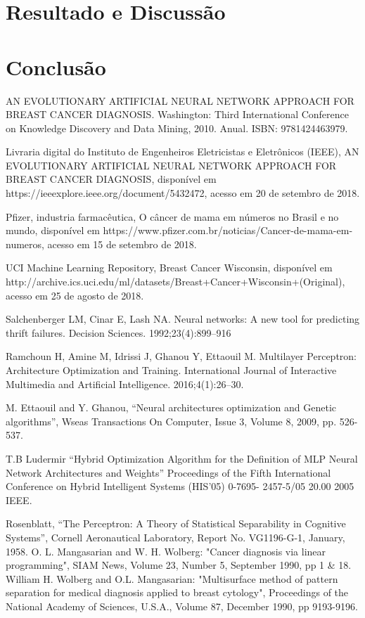 \documentclass[conference]{IEEEtran}
\begin{document}
\section{Resultado e Discussão}

   
    
\section*{Conclusão}

  

\begin{thebibliography}{00}

 AN EVOLUTIONARY ARTIFICIAL NEURAL NETWORK APPROACH FOR BREAST CANCER DIAGNOSIS. Washington: Third International Conference on Knowledge Discovery and Data Mining, 2010. Anual. ISBN: 9781424463979.

 Livraria digital do Instituto de Engenheiros Eletricistas e Eletrônicos (IEEE), AN EVOLUTIONARY ARTIFICIAL NEURAL NETWORK APPROACH FOR BREAST CANCER DIAGNOSIS, disponível em https://ieeexplore.ieee.org/document/5432472, acesso em 20 de setembro de 2018.

 Pfizer, industria farmacêutica, O câncer de mama em números no Brasil e no mundo, disponível em https://www.pfizer.com.br/noticias/Cancer-de-mama-em-numeros, acesso em 15 de setembro de 2018.

 UCI Machine Learning Repository, Breast Cancer Wisconsin, disponível em http://archive.ics.uci.edu/ml/datasets/Breast+Cancer+Wisconsin+(Original), acesso em 25 de agosto de 2018.

 Salchenberger LM, Cinar E, Lash NA. Neural networks: A new tool for predicting thrift failures. Decision Sciences. 1992;23(4):899–916

 Ramchoun H, Amine M, Idrissi J, Ghanou Y, Ettaouil M. Multilayer Perceptron: Architecture Optimization and Training. International Journal of Interactive Multimedia and Artificial Intelligence. 2016;4(1):26–30.

 M. Ettaouil and Y. Ghanou, “Neural architectures optimization and Genetic algorithms”, Wseas Transactions On Computer, Issue 3, Volume 8, 2009, pp. 526-537. 

 T.B Ludermir “Hybrid Optimization Algorithm for the Definition of MLP Neural Network Architectures and Weights” Proceedings of the Fifth International Conference on Hybrid Intelligent Systems (HIS’05) 0-7695- 2457-5/05 20.00 2005 IEEE.

 Rosenblatt, “The Perceptron: A Theory of Statistical Separability in Cognitive Systems”, Cornell Aeronautical Laboratory, Report No. VG1196-G-1, January, 1958. 
 O. L. Mangasarian and W. H. Wolberg: "Cancer          diagnosis via linear 
      programming", SIAM News, Volume 23, Number 5, September 1990, pp 1 & 18.
 William H. Wolberg and O.L. Mangasarian: "Multisurface method of 
      pattern separation for medical diagnosis applied to breast cytology", 
      Proceedings of the National Academy of Sciences, U.S.A., Volume 87, 
      December 1990, pp 9193-9196.
\end{thebibliography}
\end{document}
